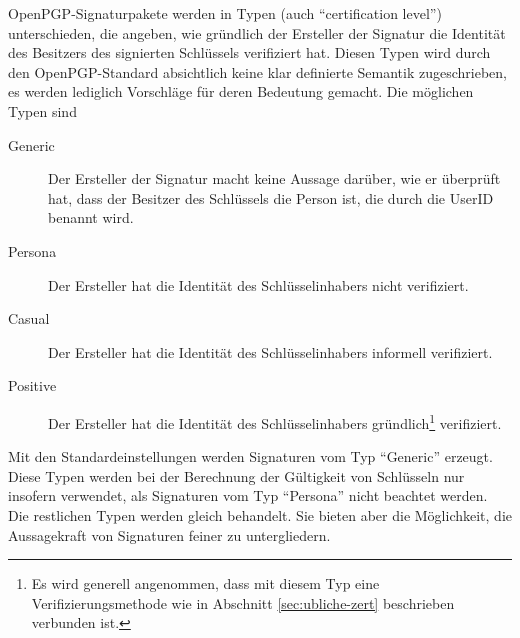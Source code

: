 OpenPGP-Signaturpakete werden in Typen (auch "`certification
level"') unterschieden, die angeben, wie gründlich der Ersteller der
Signatur die Identität des Besitzers des signierten Schlüssels
verifiziert hat. Diesen Typen wird durch den OpenPGP-Standard
absichtlich keine klar definierte Semantik zugeschrieben, es werden
lediglich Vorschläge für deren Bedeutung gemacht. Die möglichen
Typen sind

\begin{description}
\item[Generic] Der Ersteller der Signatur macht keine Aussage
  darüber, wie er überprüft hat, dass der Besitzer des
  Schlüssels die Person ist, die durch die UserID benannt wird.
\item[Persona] Der Ersteller hat die Identität des
  Schlüsselinhabers nicht verifiziert.
\item[Casual] Der Ersteller hat die Identität des
  Schlüsselinhabers informell verifiziert.
\item[Positive] Der Ersteller hat die Identität des
  Schlüsselinhabers gründlich\footnote{Es wird generell
    angenommen, dass mit diesem Typ eine Verifizierungsmethode wie in
    Abschnitt \ref{sec:ubliche-zert} beschrieben verbunden ist.}
  verifiziert.
\end{description}

Mit den Standardeinstellungen werden Signaturen vom Typ "`Generic"'
erzeugt. Diese Typen werden bei der Berechnung der Gültigkeit von
Schlüsseln nur insofern verwendet, als Signaturen vom Typ
"`Persona"' nicht beachtet werden. Die restlichen Typen werden gleich
behandelt. Sie bieten aber die Möglichkeit, die Aussagekraft von
Signaturen feiner zu untergliedern.

